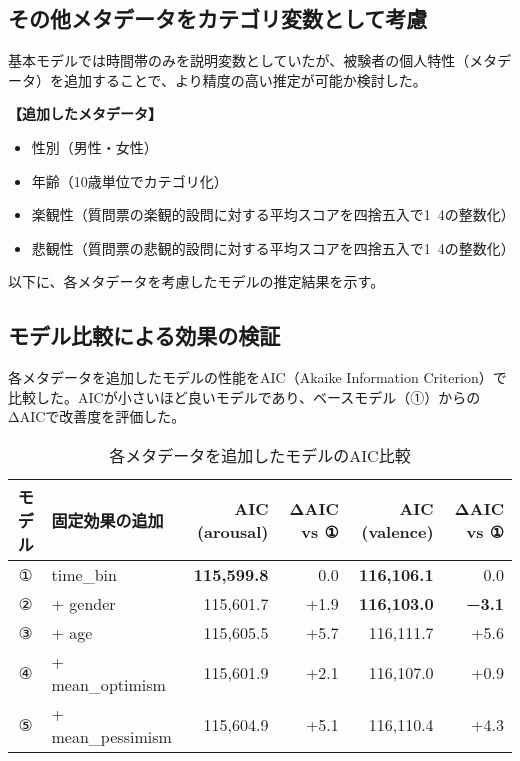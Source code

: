 \documentclass[a4paper,11pt]{article}
\begin{document}
\subsection*{その他メタデータをカテゴリ変数として考慮}
基本モデルでは時間帯のみを説明変数としていたが、被験者の個人特性（メタデータ）を追加することで、より精度の高い推定が可能か検討した。

\vspace{2ex}
\noindent \textbf{【追加したメタデータ】}

\begin{itemize}
\item 性別（男性・女性）

\item 年齢（10歳単位でカテゴリ化）

\item 楽観性（質問票の楽観的設問に対する平均スコアを四捨五入で1~4の整数化）

\item 悲観性（質問票の悲観的設問に対する平均スコアを四捨五入で1~4の整数化）

\end{itemize}

\vspace{2ex}
以下に、各メタデータを考慮したモデルの推定結果を示す。

\vspace{3ex}
\subsection*{モデル比較による効果の検証}

各メタデータを追加したモデルの性能をAIC（Akaike Information Criterion）で比較した。AICが小さいほど良いモデルであり、ベースモデル（①）からのΔAICで改善度を評価した。

\vspace{2ex}
\begin{table}[H]
\centering
\begin{tabular}{|c|l|r|r|r|r|}
\hline
モデル & 固定効果の追加 & AIC (arousal) & ΔAIC vs ① & AIC (valence) & ΔAIC vs ① \\
\hline
① & time\_bin & \textbf{115,599.8} & 0.0 & \textbf{116,106.1} & 0.0 \\
② & + gender & 115,601.7 & +1.9 & \textbf{116,103.0} & \textbf{−3.1} \\
③ & + age & 115,605.5 & +5.7 & 116,111.7 & +5.6 \\
④ & + mean\_optimism & 115,601.9 & +2.1 & 116,107.0 & +0.9 \\
⑤ & + mean\_pessimism & 115,604.9 & +5.1 & 116,110.4 & +4.3 \\
\hline
\end{tabular}
\caption{各メタデータを追加したモデルのAIC比較}
\end{table}
\end{document}
